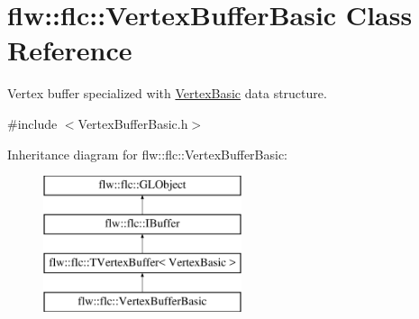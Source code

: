\hypertarget{classflw_1_1flc_1_1VertexBufferBasic}{}\section{flw\+:\+:flc\+:\+:Vertex\+Buffer\+Basic Class Reference}
\label{classflw_1_1flc_1_1VertexBufferBasic}


Vertex buffer specialized with \hyperlink{structflw_1_1flc_1_1VertexBasic}{Vertex\+Basic} data structure.  




{\ttfamily \#include $<$Vertex\+Buffer\+Basic.\+h$>$}

Inheritance diagram for flw\+:\+:flc\+:\+:Vertex\+Buffer\+Basic\+:\begin{figure}[H]
\begin{center}
\leavevmode
\includegraphics[height=4.000000cm]{classflw_1_1flc_1_1VertexBufferBasic}
\end{center}
\end{figure}
